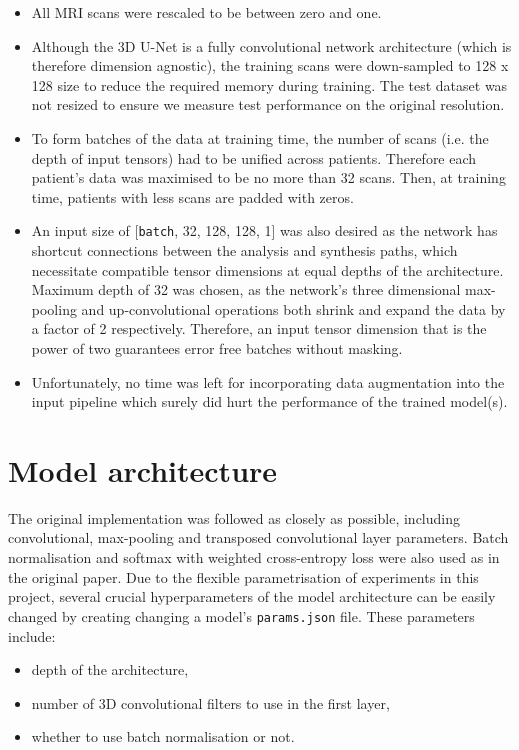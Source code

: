 \documentclass{article}
\begin{document}
\begin{itemize}
	\item All MRI scans were rescaled to be between zero and one.
	\item Although the 3D U-Net is a fully convolutional network architecture (which is therefore dimension agnostic), the training scans were down-sampled to 128 x 128 size to reduce the required memory during training. The test dataset was not resized to ensure we measure test performance on the original resolution.
	\item To form batches of the data at training time, the number of scans (i.e. the depth of input tensors) had to be unified across patients. Therefore each patient's data was maximised to be no more than 32 scans. Then, at training time, patients with less scans are padded with zeros.
	\item An input size of [\texttt{batch}, 32, 128, 128, 1] was also desired as the network has shortcut connections between the analysis and synthesis paths, which necessitate compatible tensor dimensions at equal depths of the architecture. Maximum depth of 32 was chosen, as the network's three dimensional max-pooling and up-convolutional operations both shrink and expand the data by a factor of 2 respectively. Therefore, an input tensor dimension that is the power of two guarantees error free batches without masking.
	\item Unfortunately, no time was left for incorporating data augmentation into the input pipeline which surely did hurt the performance of the trained model(s).
\end{itemize}


\section{Model architecture}

The original implementation was followed as closely as possible, including convolutional, max-pooling and transposed convolutional layer parameters. Batch normalisation \cite{ioffe2015batch} and softmax with weighted cross-entropy loss were also used as in the original paper. Due to the flexible parametrisation of experiments in this project, several crucial hyperparameters of the model architecture can be easily changed by creating changing a model's \texttt{params.json} file. These parameters include:
\begin{itemize}
	\item depth of the architecture,
	\item number of 3D convolutional filters to use in the first layer,
	\item whether to use batch normalisation or not.
\end{itemize}
\end{document}
